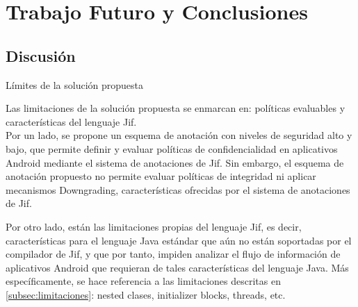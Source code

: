 \label{ch:trabajoFuturo}
\chapter{Trabajo Futuro y Conclusiones}
\section{Discusión}
Límites de la solución propuesta\newline

Las limitaciones de la solución propuesta se enmarcan en: políticas evaluables y
características del lenguaje Jif.\\
Por un lado, se propone un esquema de anotación con niveles de seguridad alto y
bajo, que permite definir y evaluar políticas de confidencialidad en aplicativos
Android mediante el sistema de anotaciones de Jif.
Sin embargo, el esquema de anotación propuesto no permite evaluar políticas de
integridad ni aplicar mecanismos Downgrading, características ofrecidas por el
sistema de anotaciones de Jif.

Por otro lado, están las limitaciones propias del lenguaje Jif, es decir,
características para el lenguaje Java estándar que aún no están soportadas por
el compilador de Jif, y que por tanto, impiden analizar el flujo de información
de aplicativos Android que requieran de tales características del lenguaje Java.
Más específicamente, se hace referencia a las limitaciones descritas en
\ref{subsec:limitaciones}: nested clases, initializer blocks, threads, etc.



